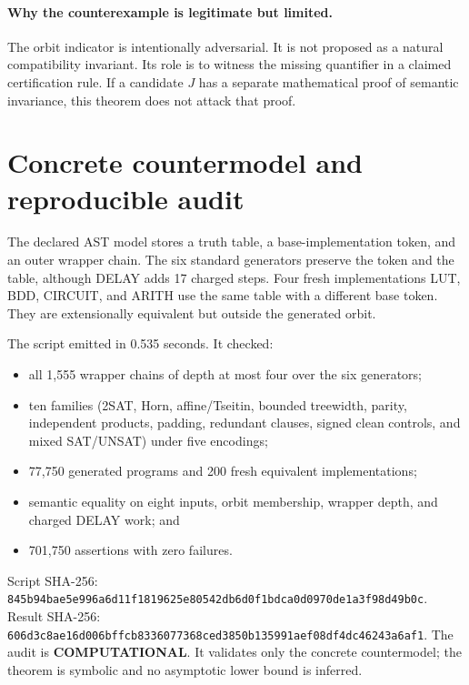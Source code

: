 \documentclass[11pt]{article}
\newcommand{\COMP}{\textbf{COMPUTATIONAL}}
\begin{document}
\paragraph{Why the counterexample is legitimate but limited.}
The orbit indicator is intentionally adversarial.  It is not proposed as a
natural compatibility invariant.  Its role is to witness the missing
quantifier in a claimed certification rule.  If a candidate $J$ has a
separate mathematical proof of semantic invariance, this theorem does not
attack that proof.

\section{Concrete countermodel and reproducible audit}
The declared AST model stores a truth table, a base-implementation token, and
an outer wrapper chain.  The six standard generators preserve the token and
the table, although DELAY adds 17 charged steps.  Four fresh implementations
LUT, BDD, CIRCUIT, and ARITH use the same table with a different base token.
They are extensionally equivalent but outside the generated orbit.

The script
 emitted
 in
0.535 seconds.  It checked:
\begin{itemize}[leftmargin=1.5em]
\item all 1,555 wrapper chains of depth at most four over the six generators;
\item ten families (2SAT, Horn, affine/Tseitin, bounded treewidth, parity,
independent products, padding, redundant clauses, signed clean controls, and
mixed SAT/UNSAT) under five encodings;
\item 77,750 generated programs and 200 fresh equivalent implementations;
\item semantic equality on eight inputs, orbit membership, wrapper depth, and
charged DELAY work; and
\item 701,750 assertions with zero failures.
\end{itemize}
Script SHA-256:
\texttt{845b94bae5e996a6d11f1819625e80542db6d0f1bdca0d0970de1a3f98d49b0c}.
Result SHA-256:
\texttt{606d3c8ae16d006bffcb8336077368ced3850b135991aef08df4dc46243a6af1}.
The audit is \COMP.  It validates only the concrete countermodel; the theorem
is symbolic and no asymptotic lower bound is inferred.
\end{document}
